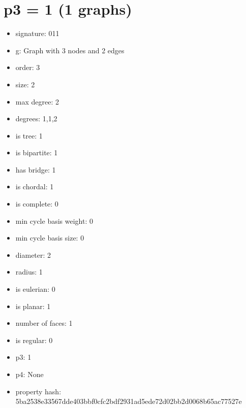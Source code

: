 \chapter{p3 = 1 (1 graphs)}
\newpage\begin{figure}
\end{figure}
\begin{itemize}
\item signature: 011
\item g: Graph with 3 nodes and 2 edges
\item order: 3
\item size: 2
\item max degree: 2
\item degrees: 1,1,2
\item is tree: 1
\item is bipartite: 1
\item has bridge: 1
\item is chordal: 1
\item is complete: 0
\item min cycle basis weight: 0
\item min cycle basis size: 0
\item diameter: 2
\item radius: 1
\item is eulerian: 0
\item is planar: 1
\item number of faces: 1
\item is regular: 0
\item p3: 1
\item p4: None
\item property hash: 5ba2538e33567dde403bbf0cfc2bdf2931ad5ede72d02bb2d0068b65ac77527e
\end{itemize}
\newpage
